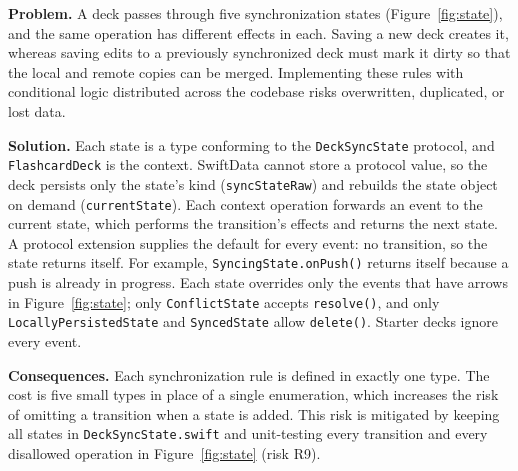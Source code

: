 \documentclass[12pt,letterpaper]{article}
\begin{document}
\textbf{Problem.} A deck passes through five synchronization states
(Figure~\ref{fig:state}), and the same operation has different effects in each.
Saving a new deck creates it, whereas saving edits to a previously synchronized deck
must mark it dirty so that the local and remote copies can be merged. Implementing
these rules with conditional logic distributed across the codebase risks overwritten,
duplicated, or lost data.

\textbf{Solution.} Each state is a type conforming to the \texttt{DeckSyncState}
protocol, and \texttt{FlashcardDeck} is the context. SwiftData cannot store a protocol
value, so the deck persists only the state's kind (\texttt{syncStateRaw}) and rebuilds
the state object on demand (\texttt{currentState}). Each context operation forwards an
event to the current state, which performs the transition's effects and returns the
next state. A protocol extension supplies the default for every event: no transition,
so the state returns itself. For example, \texttt{SyncingState.onPush()} returns
itself because a push is already in progress. Each state overrides only the events
that have arrows in Figure~\ref{fig:state}; only \texttt{ConflictState} accepts
\texttt{resolve()}, and only \texttt{LocallyPersistedState} and \texttt{SyncedState}
allow \texttt{delete()}. Starter decks ignore every event.

\textbf{Consequences.} Each synchronization rule is defined in exactly one type. The
cost is five small types in place of a single enumeration, which increases the risk
of omitting a transition when a state is added. This risk is mitigated by keeping all
states in \texttt{DeckSyncState.swift} and unit-testing every transition and every
disallowed operation in Figure~\ref{fig:state} (risk R9).

\FloatBarrier
\end{document}
